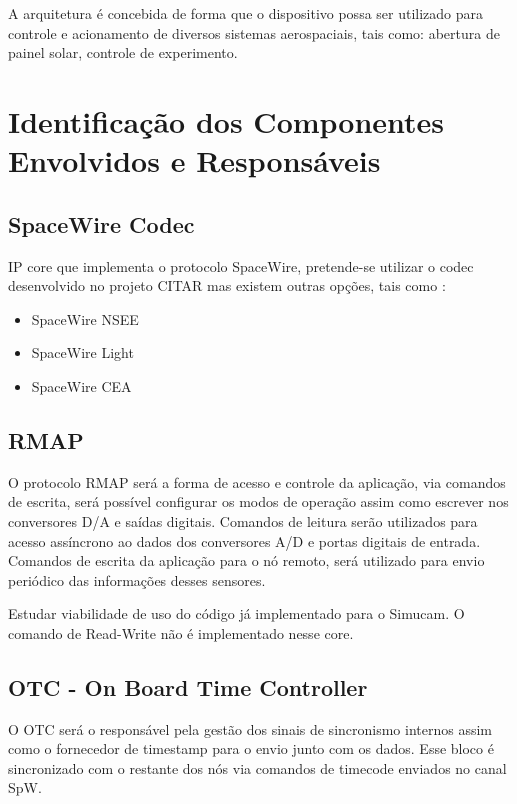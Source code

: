 A arquitetura é concebida de forma que o dispositivo possa ser utilizado para controle e acionamento de diversos sistemas aerospaciais, tais como: abertura de painel solar, controle de experimento.

\chapter{Identificação dos Componentes Envolvidos e Responsáveis}

\section{SpaceWire Codec}

IP core que implementa o protocolo SpaceWire, pretende-se utilizar o codec desenvolvido no projeto CITAR mas existem outras opções, tais como :

\begin{itemize}
	\item SpaceWire NSEE
	\item SpaceWire Light
	\item SpaceWire CEA
\end{itemize}

\section{RMAP}

O protocolo RMAP será a forma de acesso e controle da aplicação, via comandos de escrita, será possível configurar os modos de operação assim como escrever nos conversores D/A e saídas digitais. Comandos de leitura serão utilizados para acesso assíncrono ao dados dos conversores A/D e portas digitais de entrada. Comandos de escrita da aplicação para o nó remoto, será utilizado para envio periódico das informações desses sensores.

Estudar viabilidade de uso do código já implementado para o Simucam. O comando de Read-Write não é implementado nesse core.

\section{OTC - On Board Time Controller}

O OTC será o responsável pela gestão dos sinais de sincronismo internos assim como o fornecedor de timestamp para o envio junto com os dados. Esse bloco é sincronizado com o restante dos nós via comandos de timecode enviados no canal SpW.

